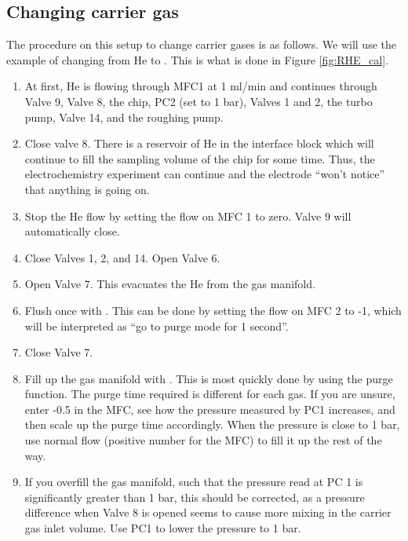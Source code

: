 \subsection{Changing carrier gas}
The procedure on this setup to change carrier gases is as follows. We will use the example of changing from He to . This is what is done in Figure \ref{fig:RHE_cal}.

\begin{enumerate}
	\item At first, He is flowing through MFC1 at 1 ml/min and continues through Valve 9, Valve 8, the chip, PC2 (set to 1 bar), Valves 1 and 2, the turbo pump, Valve 14, and the roughing pump.
	
	\item Close valve 8. There is a reservoir of He in the interface block which will continue to fill the sampling volume of the chip for some time. Thus, the electrochemistry experiment can continue and the electrode ``won't notice'' that anything is going on.
	
	\item Stop the He flow by setting the flow on MFC 1 to zero. Valve 9 will automatically close.
	
	\item Close Valves 1, 2, and 14. Open Valve 6.
	
	\item Open Valve 7. This evacuates the He from the gas manifold. 
	
	\item Flush once with . This can be done by setting the flow on MFC 2 to -1, which will be interpreted as ``go to purge mode for 1 second''.
	
	\item Close Valve 7. 
	
	\item Fill up the gas manifold with . This is most quickly done by using the purge function. The purge time required is different for each gas. If you are unsure, enter -0.5 in the MFC, see how the pressure measured by PC1 increases, and then scale up the purge time accordingly. When the pressure is close to 1 bar, use normal flow (positive number for the MFC) to fill it up the rest of the way.
	
	\item If you overfill the gas manifold, such that the pressure read at PC 1 is significantly greater than 1 bar, this should be corrected, as a pressure difference when Valve 8 is opened seems to cause more mixing in the carrier gas inlet volume. Use PC1 to lower the pressure to 1 bar.
	

\end{enumerate}

